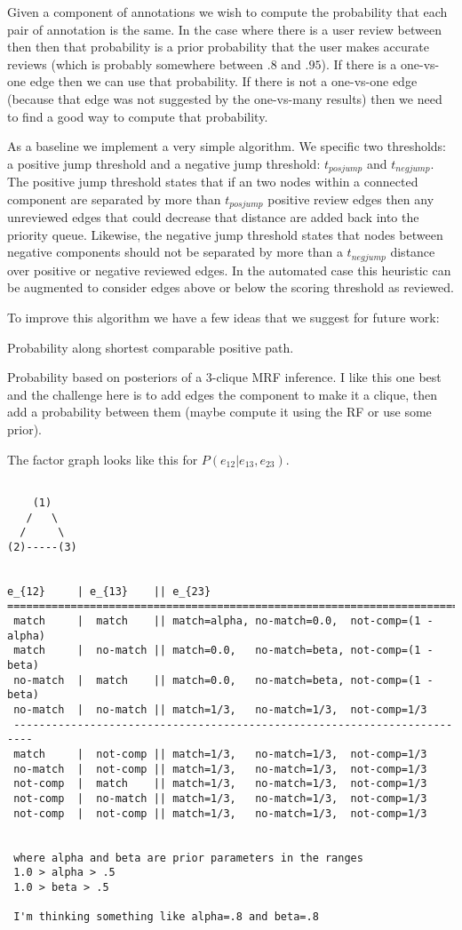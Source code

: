 Given a component of annotations we wish to compute the probability that each
  pair of annotation is the same.
In the case where there is a user review between then then that probability is
  a prior probability that the user makes accurate reviews (which is probably
  somewhere between $.8$ and $.95$).
If there is a one-vs-one edge then we can use that probability.
If there is not a one-vs-one edge (because that edge was not suggested by the
  one-vs-many results) then we need to find a good way to compute that
  probability.


As a baseline we implement a very simple algorithm.
We specific two thresholds:
a positive jump threshold and a negative jump threshold:
$t_{posjump}$  and $t_{negjump}$.
The positive jump threshold states that if an two nodes within a connected
  component are separated by more than $t_{posjump}$ positive review edges then
  any unreviewed edges that could decrease that distance are added back into the
  priority queue.
Likewise, the negative jump threshold states that nodes between negative
  components should not be separated by more than a $t_{negjump}$ distance over
  positive or negative reviewed edges.
In the automated case this heuristic can be augmented to consider edges above
  or below the scoring threshold as reviewed.


To improve this algorithm we have a few ideas that we suggest for future work:

Probability along shortest comparable positive path.

Probability based on posteriors of a 3-clique MRF inference.
I like this one best and the challenge here is to add edges the component to
  make it a clique, then add a probability between them (maybe compute it using
  the RF or use some prior).


  The factor graph looks like this for $P(e_{12} | e_{13}, e_{23})$.

\begin{verbatim}

    (1)
   /   \
  /     \
(2)-----(3)


e_{12}     | e_{13}    || e_{23}
==========================================================================
 match     |  match    || match=alpha, no-match=0.0,  not-comp=(1 - alpha)
 match     |  no-match || match=0.0,   no-match=beta, not-comp=(1 - beta)
 no-match  |  match    || match=0.0,   no-match=beta, not-comp=(1 - beta)
 no-match  |  no-match || match=1/3,   no-match=1/3,  not-comp=1/3
 -------------------------------------------------------------------------
 match     |  not-comp || match=1/3,   no-match=1/3,  not-comp=1/3
 no-match  |  not-comp || match=1/3,   no-match=1/3,  not-comp=1/3
 not-comp  |  match    || match=1/3,   no-match=1/3,  not-comp=1/3
 not-comp  |  no-match || match=1/3,   no-match=1/3,  not-comp=1/3
 not-comp  |  not-comp || match=1/3,   no-match=1/3,  not-comp=1/3


 where alpha and beta are prior parameters in the ranges
 1.0 > alpha > .5
 1.0 > beta > .5

 I'm thinking something like alpha=.8 and beta=.8

\end{verbatim}

